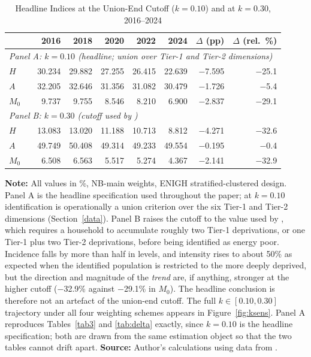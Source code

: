 \documentclass[11pt, a4paper]{article}
\begin{document}
\begin{table}[htb]
\centering
\caption{Headline Indices at the Union-End Cutoff ($k=0.10$) and at $k=0.30$, 2016--2024}
\small
\begin{tabularx}{\textwidth}{l X rrrrr rr}
\toprule
\toprule
 & & 2016 & 2018 & 2020 & 2022 & 2024 & $\Delta$ (pp) & $\Delta$ (rel.\ \%) \\ \midrule
\multicolumn{9}{l}{\textit{Panel A: $k=0.10$ (headline; union over Tier-1 and Tier-2 dimensions)}} \\[2pt]
$H$   & & 30.234 & 29.882 & 27.255 & 26.415 & 22.639 & $-$7.595 & $-$25.1 \\
$A$   & & 32.205 & 32.646 & 31.356 & 31.082 & 30.479 & $-$1.726 & $-$5.4 \\
$M_0$ & & 9.737  & 9.755  & 8.546  & 8.210  & 6.900  & $-$2.837 & $-$29.1 \\[4pt]
\multicolumn{9}{l}{\textit{Panel B: $k=0.30$ (cutoff used by \textcite{nussbaumer2012})}} \\[2pt]
$H$   & & 13.083 & 13.020 & 11.188 & 10.713 & 8.812  & $-$4.271 & $-$32.6 \\
$A$   & & 49.749 & 50.408 & 49.314 & 49.233 & 49.554 & $-$0.195 & $-$0.4 \\
$M_0$ & & 6.508  & 6.563  & 5.517  & 5.274  & 4.367  & $-$2.141 & $-$32.9 \\
\bottomrule
\end{tabularx}
\begin{justify}
\scriptsize
\textbf{Note:} All values in \%, NB-main weights, ENIGH stratified-clustered design. Panel A is the headline specification used throughout the paper; at $k=0.10$ identification is operationally a union criterion over the six Tier-1 and Tier-2 dimensions (Section~\ref{data}). Panel B raises the cutoff to the value used by \textcite{nussbaumer2012}, which requires a household to accumulate roughly two Tier-1 deprivations, or one Tier-1 plus two Tier-2 deprivations, before being identified as energy poor. Incidence falls by more than half in levels, and intensity rises to about 50\% as expected when the identified population is restricted to the more deeply deprived, but the direction and magnitude of the \emph{trend} are, if anything, stronger at the higher cutoff ($-$32.9\% against $-$29.1\% in $M_0$). The headline conclusion is therefore not an artefact of the union-end cutoff. The full $k\in[0.10,0.30]$ trajectory under all four weighting schemes appears in Figure~\ref{fig:ksens}. Panel A reproduces Tables~\ref{tab3} and \ref{tab:delta} exactly, since $k=0.10$ is the headline specification; both are drawn from the same estimation object so that the two tables cannot drift apart. \textbf{Source:} Author's calculations using data from \textcite{enigh2016, enigh2018, enigh2020, enigh2022, enigh2024}.
\end{justify}
\label{tab:ksens_headline}
\end{table}
\end{document}
